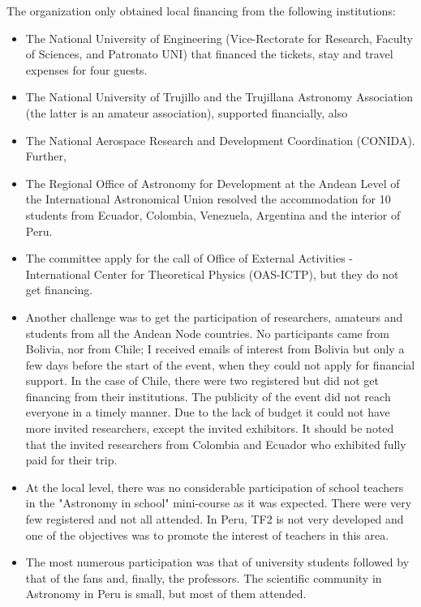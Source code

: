  The organization only obtained local financing from the following institutions:
 
 \begin{itemize}
        \item The National University of Engineering (Vice-Rectorate for Research, Faculty of Sciences, and Patronato UNI) that financed the tickets, stay and travel expenses for four guests.
        \item The National University of Trujillo and the Trujillana Astronomy Association (the latter is an amateur association), supported financially, also
        \item The National Aerospace Research and Development Coordination (CONIDA).
        Further,
        \item The Regional Office of Astronomy for Development at the Andean Level of the International Astronomical Union resolved the accommodation for 10 students from Ecuador, Colombia, Venezuela, Argentina and the interior of Peru.
        \item The committee apply for the call of Office of External Activities - International Center for Theoretical Physics (OAS-ICTP), but they do not get financing.
\end{itemize}

\begin{itemize}    
    \item Another challenge was to get the participation of researchers, amateurs and students from all the Andean Node countries. No participants came from Bolivia, nor from Chile; I received emails of interest from Bolivia but only a few days before the start of the event, when they could not apply for financial support. In the case of Chile, there were two registered but did not get financing from their institutions. The publicity of the event did not reach everyone in a timely manner. Due to the lack of budget it could not have more invited researchers, except the invited exhibitors. It should be noted that the invited researchers from Colombia and Ecuador who exhibited fully paid for their trip.
    
    \item At the local level, there was no considerable participation of school teachers in the "Astronomy in school" mini-course as it was expected. There were very few registered and not all attended. In Peru, TF2 is not very developed and one of the objectives was to promote the interest of teachers in this area.
    
    \item The most numerous participation was that of university students followed by that of the fans and, finally, the professors. The scientific community in Astronomy in Peru is small, but most of them attended. 
\end{itemize}

